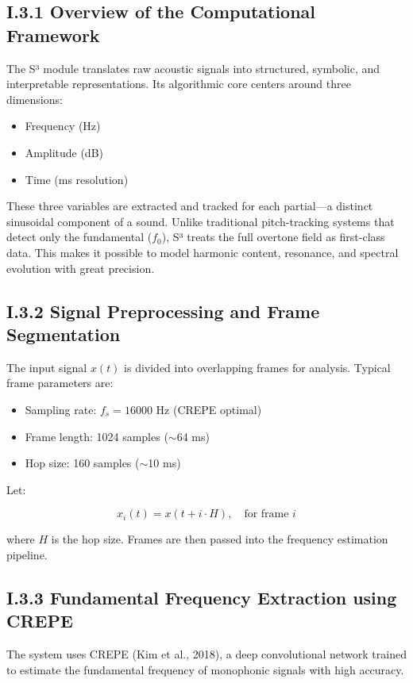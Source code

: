 \subsection*{I.3.1 Overview of the Computational Framework}

The S³ module translates raw acoustic signals into structured, symbolic, and interpretable representations. Its algorithmic core centers around three dimensions:

\begin{itemize}
    \item Frequency (Hz)
    \item Amplitude (dB)
    \item Time (ms resolution)
\end{itemize}

These three variables are extracted and tracked for each partial—a distinct sinusoidal component of a sound. Unlike traditional pitch-tracking systems that detect only the fundamental ($f_0$), S³ treats the full overtone field as first-class data. This makes it possible to model harmonic content, resonance, and spectral evolution with great precision.

\subsection*{I.3.2 Signal Preprocessing and Frame Segmentation}

The input signal $x(t)$ is divided into overlapping frames for analysis. Typical frame parameters are:

\begin{itemize}
    \item Sampling rate: $f_s = 16000$ Hz (CREPE optimal)
    \item Frame length: 1024 samples ($\sim$64 ms)
    \item Hop size: 160 samples ($\sim$10 ms)
\end{itemize}

Let:

\[
x_i(t) = x(t + i \cdot H), \quad \text{for frame } i
\]

where $H$ is the hop size. Frames are then passed into the frequency estimation pipeline.

\subsection*{I.3.3 Fundamental Frequency Extraction using CREPE}

The system uses CREPE (Kim et al., 2018), a deep convolutional network trained to estimate the fundamental frequency of monophonic signals with high accuracy.

